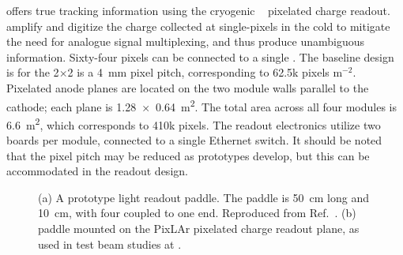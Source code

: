  offers true \threed tracking information using the  cryogenic ~\cite{larpix} pixelated charge readout.   amplify and digitize the charge collected at single-pixels in the cold to mitigate the need for analogue signal multiplexing, and thus produce unambiguous \threed information. Sixty-four pixels can be connected to a single  . The baseline design is for the 2$\times$2 is a \SI{4}{\milli\metre} pixel pitch, corresponding to 62.5k pixels m$^{-2}$. Pixelated anode planes are located on the two module walls parallel to the cathode; each plane is \SI[product-units=repeat]{1.28x0.64}{\metre\squared}. The total area across all four modules is \SI{6.6}{\metre\squared}, which corresponds to 410k pixels. The readout electronics utilize two  boards per module, connected to a single Ethernet switch. It should be noted that the pixel pitch may be reduced as prototypes develop, but this can be accommodated in the readout design. 

\begin{figure}[!ht]
	\centering
	\caption[A prototype ArgonCube light readout paddle and a mounted ArCLight paddle]{(a) A prototype  light readout paddle. The paddle is \SI{50}{cm} long and \SI{10}{cm}, with four  coupled to one end. Reproduced from Ref.~\cite{argoncube_loi}. (b)  paddle mounted on the PixLAr pixelated charge readout plane, as used in test beam studies at .}
	\label{fig:arclight}
\end{figure}




